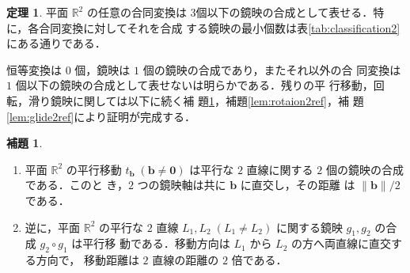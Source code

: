 \documentclass[11pt, uplatex, dvipdfmx, titlepage]{jsarticle}
\makeatletter
\DeclareMathOperator{\Inv}{Inv}
\renewenvironment{proof}[1][\proofname]{\par
  \pushQED{\qed}%
  \normalfont \topsep6\p@\@plus6\p@\relax
  \trivlist
  \item[\hskip\labelsep
         \bfseries
    {#1}]\ignorespaces
}{%
  \popQED\endtrivlist\@endpefalse
}
\theoremstyle{definition}
\newtheorem{theorem}{定理}[section]
\newtheorem{lemma}{補題}[section]
\renewcommand{\proofname}{\textbf{証明}}
\makeatother
\begin{document}





\begin{theorem}\label{thm:generate2}
  平面 $\mathbb{R}^2$ の任意の合同変換は
  $3$個以下の鏡映の合成として表せる．特に，各合同変換に対してそれを合成
  する鏡映の最小個数は表\ref{tab:classification2}にある通りである．
\end{theorem}
\begin{proof}
  恒等変換は $0$ 個，鏡映は $1$ 個の鏡映の合成であり，またそれ以外の合
  同変換は $1$ 個以下の鏡映の合成として表せないは明らかである．残りの平
  行移動，回転，滑り鏡映に関しては以下に続く補
  題\ref{lem:translation2ref}，補題\ref{lem:rotaion2ref}，補
  題\ref{lem:glide2ref}により証明が完成する．
\end{proof}

  
\begin{lemma}\label{lem:translation2ref}
  \begin{enumerate}[(1)]
  \item 平面 $\mathbb{R}^2$ の平行移動 $t_{\bm{b}} \; (\bm{b} \neq
    \bm{0})$ は平行な $2$ 直線に関する $2$ 個の鏡映の合成である．このと
    き，$2$ つの鏡映軸は共に $\bm{b}$ に直交し，その距離
    は $\|\bm{b}\|/2$ である．
    
  \item 逆に，平面 $\mathbb{R}^2$ の平行な $2$ 直線 $L_1, L_2 \;(L_1
    \neq L_2)$ に関する鏡映 $g_1, g_2$ の合成 $g_2 \circ g_1$ は平行移
    動である．移動方向は $L_1$ から $L_2$ の方へ両直線に直交する方向で，
    移動距離は $2$ 直線の距離の $2$ 倍である．
  \end{enumerate}
  
\end{lemma}
\end{document}
